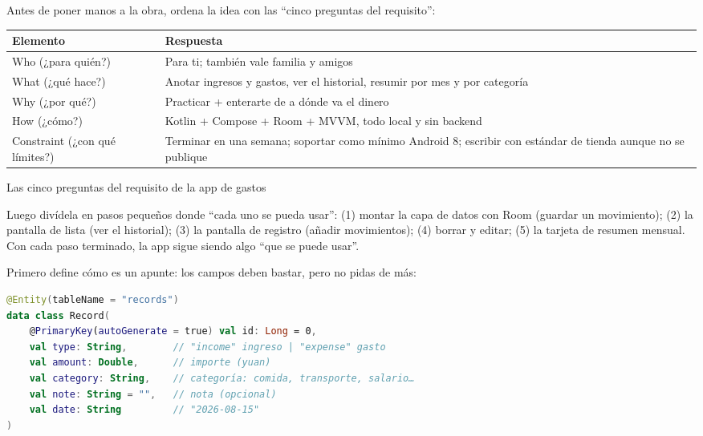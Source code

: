 


Antes de poner manos a la obra, ordena la idea con las “cinco preguntas del requisito”:

\begin{center}
\begin{tabularx}{\linewidth}{|X|X|}
\hline
\textbf{Elemento} & \textbf{Respuesta} \tabularnewline
\hline
Who (¿para quién?) & Para ti; también vale familia y amigos \tabularnewline
What (¿qué hace?) & Anotar ingresos y gastos, ver el historial, resumir por mes y por categoría \tabularnewline
Why (¿por qué?) & Practicar + enterarte de a dónde va el dinero \tabularnewline
How (¿cómo?) & Kotlin + Compose + Room + MVVM, todo local y sin backend \tabularnewline
Constraint (¿con qué límites?) & Terminar en una semana; soportar como mínimo Android 8; escribir con estándar de tienda aunque no se publique \tabularnewline
\hline
\end{tabularx}
\end{center}

\begin{center}\small\color{gray}Las cinco preguntas del requisito de la app de gastos\end{center}

Luego divídela en pasos pequeños donde “cada uno se pueda usar”: (1) montar la capa de datos con Room (guardar un movimiento); (2) la pantalla de lista (ver el historial); (3) la pantalla de registro (añadir movimientos); (4) borrar y editar; (5) la tarjeta de resumen mensual. Con cada paso terminado, la app sigue siendo algo “que se puede usar”.


Primero define cómo es un apunte: los campos deben bastar, pero no pidas de más:

\begin{lstlisting}[language=Kotlin]
@Entity(tableName = "records")
data class Record(
    @PrimaryKey(autoGenerate = true) val id: Long = 0,
    val type: String,        // "income" ingreso | "expense" gasto
    val amount: Double,      // importe (yuan)
    val category: String,    // categoría: comida, transporte, salario…
    val note: String = "",   // nota (opcional)
    val date: String         // "2026-08-15"
)
\end{lstlisting}

